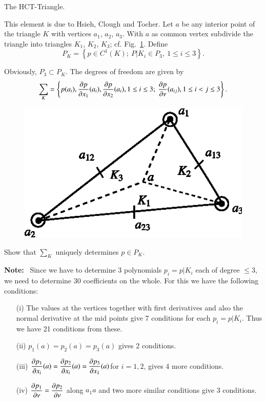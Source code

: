 \begin{exercise}\label{chap4-exer4.8}
The HCT-Triangle.

This element is due to Hsieh, Clough and Tocher. Let $a$ be any interior
point of the triangle $K$ with vertices $a_{1}$, $a_{2}$,
$a_{3}$. With $a$ as common vertex subdivide the triangle into
triangles $K_{1}$, $K_{2}$, $K_{3}$;
cf. Fig.~\ref{chap4-fig4.9}. Define
$$
P_{K}=\left\{p\in C^{1}(K);\ P|K_{i}\in P_{3},\ 1\leq i\leq 3\right\}.
$$

Obviously, $P_{3}\subset P_{K}$. The degrees of freedom are given by
$$
\sum_{K}=\left\{p(a_{i}),\frac{\partial p}{\partial x_{1}}(a_{i}), \frac{\partial p}{\partial
  x_{2}}(a_{i}),1\leq i\leq 3;\ \frac{\partial p}{\partial \nu}(a_{ij}),1\leq
i<j\leq 3\right\}.
$$
\begin{figure}[H]
\centering
\includegraphics{figure/fig4.9.eps}
\caption{}\label{chap4-fig4.9}
\end{figure}

Show that $\sum_{K}$ uniquely determines $p\in P_{K}$.
\end{exercise}

\noindent
{\bf Note:}~ Since we have to determine 3 polynomials $p_{i}=p|K_{i}$
each of degree $\leq 3$, we need to determine 30 coefficients on the
whole. For this we have the following conditions:
\begin{itemize}
\item[(i)] The values at the vertices together with first derivatives
  and also the normal derivative at the mid points give 7 conditions
  for each $p_{i}=p|K_{i}$. Thus we have 21 conditions from these.

\item[(ii)] $p_{1}(a)=p_{2}(a)=p_{3}(a)$ gives 2 conditions.

\item[(iii)] $\dfrac{\partial p_{1}}{\partial x_{i}}(a)=\dfrac{\partial p_{2}}{\partial
  x_{i}}(a)=\dfrac{\partial p_{3}}{\partial x_{1}}(a)$\pageoriginale for $i=1,2$,
  gives 4 more conditions.

\item[(iv)] $\dfrac{\partial p_{1}}{\partial \nu}=\dfrac{\partial p_{2}}{\partial \nu}$ along
  $a_{1}a$ and two more similar conditions give 3 conditions.
\end{itemize}


